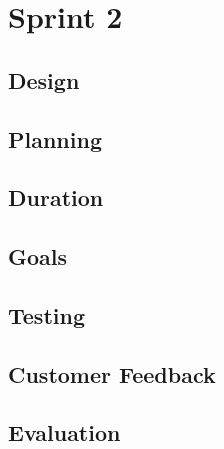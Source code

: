 \chapter{Sprint 2}
\section{Design}
\section{Planning}
\section{Duration}
\section{Goals}
\section{Testing}
\section{Customer Feedback}
\section{Evaluation}
